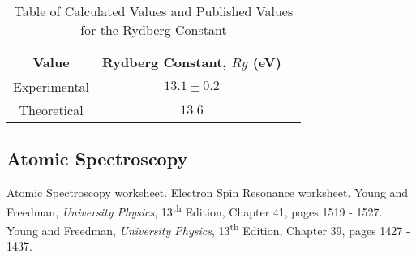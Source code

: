 \documentclass{article}
\newcommand{\figref}[2][\figurename~]{#1\ref{#2}}
\begin{document}
\vspace{5mm}
\begin{table*}[h]
\centering %
\caption{Table of Calculated Values and Published Values for the Rydberg Constant}
\label{tab:table2}
\begin{tabular}{|c|c|c|}
\hline
Value & Rydberg Constant, $Ry$ (eV) \\
\hline
Experimental & $13.1 \pm 0.2$ \\
\hline
Theoretical \cite{Paper01} & $13.6$ \\
\hline
\end{tabular}
\end{table*}

\subsection{Atomic Spectroscopy}
\label{ssec:atomic-results}





\newpage
\begin{thebibliography}{9}
 Atomic Spectroscopy worksheet.
 Electron Spin Resonance worksheet. 
 Young and Freedman, \textit{University Physics}, 13\textsuperscript{th} Edition, Chapter 41, pages 1519 - 1527.
 Young and Freedman, \textit{University Physics}, 13\textsuperscript{th} Edition, Chapter 39, pages 1427 - 1437.
\end{thebibliography}
\end{document}
